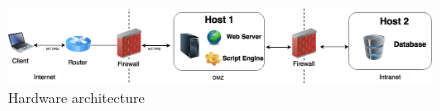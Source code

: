 \begin{figure}[H]
        \centering
        \includegraphics[width=14cm]{./Images/HardwareArchitecture.png}
        \caption{Hardware architecture}
\end{figure}